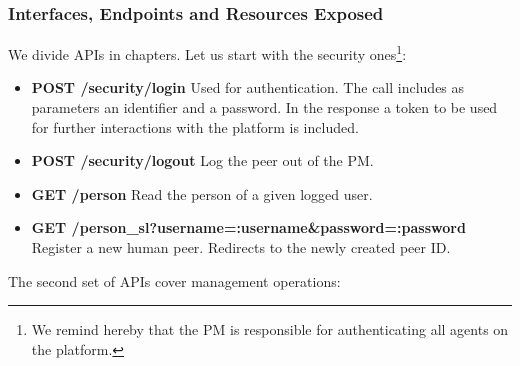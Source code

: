 \subsubsection{Interfaces, Endpoints and Resources Exposed}
We divide APIs in chapters. Let us start with the security ones\footnote{We remind hereby that the PM is responsible for authenticating all agents on the platform.}:
\begin{itemize}
\item {\bf POST /security/login} Used for authentication. The call includes as parameters an identifier and a password. In the response a token to be used for further interactions with the platform is included.
\item {\bf POST /security/logout} Log the peer out of the PM.
\item {\bf GET /person} Read the person of a given logged user. 
\item {\bf GET /person\_sl?username=:username\&password=:password} Register a new human peer. Redirects to the newly created peer ID.  
\end{itemize}
The second set of APIs cover management operations:
